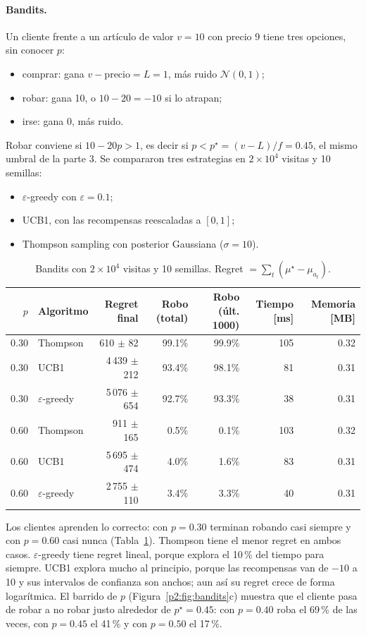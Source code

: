 \paragraph{Bandits.} Un cliente frente a un artículo de valor $v=10$ con precio 9 tiene tres opciones, sin conocer $p$:
\begin{itemize}[itemsep=1pt]
  \item comprar: gana $v-\text{precio}=L=1$, más ruido $\mathcal N(0,1)$;
  \item robar: gana 10, o $10-20=-10$ si lo atrapan;
  \item irse: gana 0, más ruido.
\end{itemize}
Robar conviene si $10-20p>1$, es decir si $p<p^\star=(v-L)/f=0.45$, el mismo umbral de la parte 3. Se compararon tres estrategias en $2\times10^4$ visitas y 10 semillas:
\begin{itemize}[itemsep=1pt]
  \item $\varepsilon$-greedy con $\varepsilon=0.1$;
  \item UCB1, con las recompensas reescaladas a $[0,1]$;
  \item Thompson sampling con posterior Gaussiana ($\sigma=10$).
\end{itemize}

\begin{table}[H]\centering\footnotesize\setlength{\tabcolsep}{4pt}
\begin{tabular}{rlrrrrr}\toprule
$p$ & Algoritmo & Regret final & Robo (total) & Robo (últ. 1000) & Tiempo [ms] & Memoria [MB]\\\midrule
0.30 & Thompson & 610 $\pm$ 82 & 99.1\% & 99.9\% & 105 & 0.32 \\
0.30 & UCB1 & 4\,439 $\pm$ 212 & 93.4\% & 98.1\% & 81 & 0.31 \\
0.30 & $\varepsilon$-greedy & 5\,076 $\pm$ 654 & 92.7\% & 93.3\% & 38 & 0.31 \\
0.60 & Thompson & 911 $\pm$ 165 & 0.5\% & 0.1\% & 103 & 0.32 \\
0.60 & UCB1 & 5\,695 $\pm$ 474 & 4.0\% & 1.6\% & 83 & 0.31 \\
0.60 & $\varepsilon$-greedy & 2\,755 $\pm$ 110 & 3.4\% & 3.3\% & 40 & 0.31 \\\bottomrule
\end{tabular}
\caption{Bandits con $2\times10^4$ visitas y 10 semillas. Regret $=\sum_t(\mu^\star-\mu_{a_t})$.}
\label{p2:tab:bandits}
\end{table}

Los clientes aprenden lo correcto: con $p=0.30$ terminan robando casi siempre y con $p=0.60$ casi nunca (Tabla~\ref{p2:tab:bandits}). Thompson tiene el menor regret en ambos casos. $\varepsilon$-greedy tiene regret lineal, porque explora el 10\,\% del tiempo para siempre. UCB1 explora mucho al principio, porque las recompensas van de $-10$ a 10 y sus intervalos de confianza son anchos; aun así su regret crece de forma logarítmica. El barrido de $p$ (Figura~\ref{p2:fig:bandits}c) muestra que el cliente pasa de robar a no robar justo alrededor de $p^\star=0.45$: con $p=0.40$ roba el 69\,\% de las veces, con $p=0.45$ el 41\,\% y con $p=0.50$ el 17\,\%.

